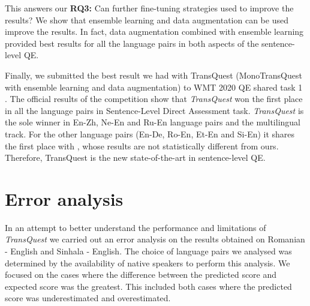 This answers our \textbf{RQ3:} Can further fine-tuning strategies used to improve the results? We show that ensemble learning and 
data augmentation can be used improve the results. In fact, data augmentation combined with ensemble learning provided best results for all the language pairs in both aspects of the sentence-level QE. 

Finally, we submitted the best result we had with TransQuest (MonoTransQuest with ensemble learning and data augmentation) to WMT 2020 QE shared task 1 \cite{specia-etal-2020-findings-wmt}. The official results of the competition show that \textit{TransQuest} won the first place in all the language pairs in Sentence-Level Direct Assessment task. \textit{TransQuest} is the sole winner in En-Zh, Ne-En and Ru-En language pairs and the multilingual track. For the other language pairs (En-De, Ro-En, Et-En and Si-En) it shares the first place with \citet{fomicheva-etal-2020-bergamot}, whose results are not statistically different from ours. Therefore, TransQuest is the new state-of-the-art in sentence-level QE.

\section{Error analysis}
\label{sec:transquest_error}

In an attempt to better understand the performance and limitations of \textit{TransQuest} we carried out an error analysis on the results obtained on Romanian - English and Sinhala - English. The choice of language pairs we analysed was determined by the availability of native speakers to perform this analysis. We focused on the cases where the difference between the predicted score and expected score was the greatest. This included both cases where the predicted score was underestimated and overestimated. 

